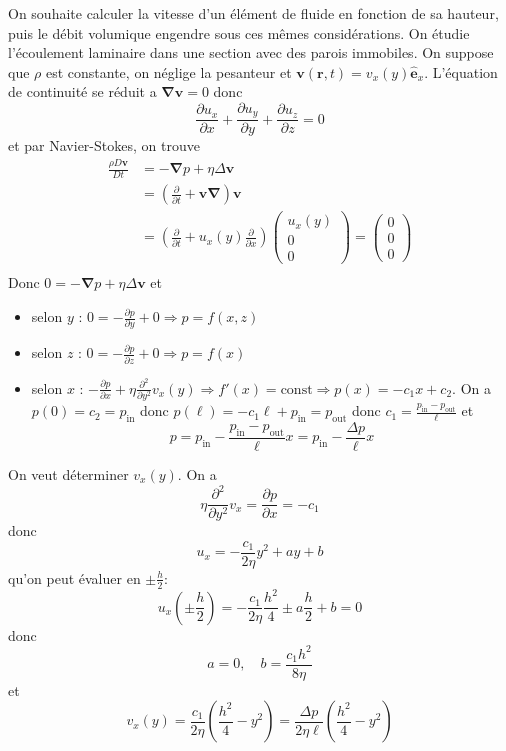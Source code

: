 
On souhaite calculer la vitesse d'un élément de fluide en fonction de sa hauteur, puis le débit volumique engendre sous ces mêmes considérations. On étudie l'écoulement laminaire dans une section avec des parois immobiles. On suppose que $\rho$ est constante, on néglige la pesanteur et $\boldsymbol{v}(\boldsymbol{r},t)=v_{x}(y)\boldsymbol{\hat{e}}_{x}$. L'équation de continuité se réduit a $\boldsymbol{\nabla v}=0$ donc
$$
\frac{ \partial u_{x} }{ \partial x } +\frac{ \partial u_{y} }{ \partial y }+\frac{ \partial u_{z} }{ \partial z } =0 
$$
et par Navier-Stokes, on trouve 
\begin{align*}
\frac{\rho D\boldsymbol{v}}{Dt} & =-\boldsymbol{\nabla}p+\eta\Delta \boldsymbol{v} \\
 & =\left( \frac{ \partial  }{ \partial t } +\boldsymbol{v\nabla} \right)\boldsymbol{v} \\
 & =\left( \frac{ \partial  }{ \partial t } +u_{x}(y)\frac{ \partial  }{ \partial x }  \right)\begin{pmatrix}
u_{x}(y) \\
0 \\
0
\end{pmatrix} =\begin{pmatrix}
0 \\
0 \\
0
\end{pmatrix} \\
\end{align*}
Donc $0=-\boldsymbol{\nabla}p+\eta\Delta \boldsymbol{v}$ et
\begin{itemize}
\item selon $y$ : $0=-\frac{ \partial p }{ \partial y }+0\Rightarrow p=f(x,z)$
\item selon $z$ : $0=-\frac{ \partial p }{ \partial z }+0\Rightarrow p=f(x)$
\item selon $x$ : $-\frac{ \partial p }{ \partial x }+\eta \frac{ \partial^{2} }{ \partial y^{2} }v_{x}(y)\Rightarrow f'(x)=\mathrm{const}\Rightarrow p(x)=-c_{1}x+c_{2}$. On a $p(0)=c_{2}=p_{\mathrm{in}}$ donc $p(\ell)=-c_{1}\ell +p_{\mathrm{in}}=p_{\mathrm{out}}$ donc $c_{1}=\frac{p_{\mathrm{in}}-p_{\mathrm{out}}}{\ell}$ et 
$$
p=p_{\mathrm{in}}-\frac{p_{\mathrm{in}}-p_{\mathrm{out}}}{\ell}x=p_{\mathrm{in}}-\frac{\Delta p}{\ell}x
$$
\end{itemize}

On veut déterminer $v_{x}(y)$. On a 
$$
\eta \frac{ \partial^{2} }{ \partial y^{2} } v_{x}=\frac{ \partial p }{ \partial x } =-c_{1}
$$
donc
$$
u_{x}=-\frac{c_{1}}{2\eta}y^{2}+ay+b
$$
qu'on peut évaluer en $\pm \frac{h}{2}$:
$$
u_{x}\left( \pm \frac{h}{2} \right)=-\frac{c_{1}}{2\eta} \frac{h^{2}}{4} \pm a \frac{h}{2}+b=0
$$
donc 
$$
a=0,\quad b=\frac{c_{1}h^{2}}{8\eta}
$$
et
$$
v_{x}(y)=\frac{c_{1}}{2\eta}\left( \frac{h^{2}}{4}-y^{2} \right)=\frac{\Delta p}{2\eta \ell}\left( \frac{h^{2}}{4}-y^{2} \right)
$$

